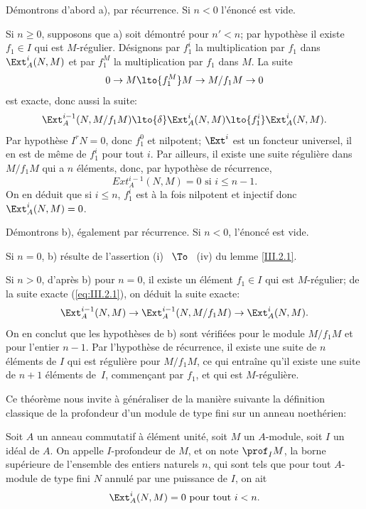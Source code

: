 D\'emontrons d'abord a), par r\'ecurrence. Si $n<0$ l'\'enonc\'e est vide.

Si $n\geq 0$, supposons que a) soit d\'emontr\'e pour $n'<n$; par hypoth\`ese il existe $f_1\in I$ qui est $M$-r\'egulier. D\'esignons par $f_1^i$ la multiplication par $f_1$ dans $\Ext_A^i(N, M)$ et par $f_1^M$ la multiplication par $f_1$ dans $M$. La suite
\begin{equation} \label{eq:III.2.1}
0 \to M \lto{f_1^M} M \to M/f_1M \to 0
\end{equation}
est exacte, donc aussi la suite:
\[
\Ext_A^{i-1} (N, M/f_1M) \lto{\delta}\Ext_A^i (N, M) \lto{f_1^i} \Ext_A^i (N, M).
\]
Par hypoth\`ese $I^rN=0$, donc $f_1^0$ et nilpotent; $\Ext^i$ est un foncteur universel, il en est de m\^eme de $f_1^i$ pour tout $i$. Par ailleurs, il existe une suite r\'eguli\`ere dans $M/f_1 M$ qui a $n$ \'el\'ements, donc, par hypoth\`ese de r\'ecurrence,
\[
Ext_A^{i-1}(N, M)=0 \text{ si } i\leq n-1.
\]
On en d\'eduit que si $i\leq n$, $f_1^i$ est \`a la fois nilpotent et injectif donc $\Ext_A^i(N, M)=0$.

D\'emontrons b), \'egalement par r\'ecurrence. Si $n<0$, l'\'enonc\'e est vide.

Si $n=0$, b) r\'esulte de l'assertion (i) ~$\To$~ (iv) du lemme \ref{III.2.1}.

Si $n>0$, d'apr\`es b) pour $n=0$, il existe un \'el\'ement $f_1\in I$ qui est $M$-r\'egulier; de la suite exacte (\ref{eq:III.2.1}), on d\'eduit la suite exacte:
\begin{equation} \label{eq:III.2.2} \Ext_A^{i-1} (N, M) \to \Ext_A^{i-1} (N, M/f_1M) \to \Ext_A^i (N, M).
\end{equation}
On en conclut que les hypoth\`eses de b) sont v\'erifi\'ees pour le
module $M/f_1M$ et pour l'entier $n-1$. Par l'hypoth\`ese de
r\'ecurrence, il existe une suite de $n$ \'el\'ements de $I$ qui est
r\'eguli\`ere pour $M/f_1M$, ce qui entra\^ine qu'il existe une
suite de $n+1$ \'el\'ements de~$I$, commen\c cant par $f_1$, et qui
est $M$-r\'eguli\`ere.

Ce th\'eor\`eme nous invite \`a g\'en\'eraliser de la mani\`ere suivante la d\'efinition classique de la profondeur d'un module de type fini sur un anneau noeth\'erien:

\begin{definition} \label{III.2.3}
Soit $A$ un anneau commutatif \`a \'el\'ement unit\'e, soit $M$ un $A$-module, soit $I$ un id\'eal de $A$. On appelle $I$-profondeur de $M$, et on note $\prof_I M$, la borne sup\'erieure \ignorespaces de l'ensemble des entiers naturels $n$, qui sont tels que pour tout $A$-module de type fini $N$ annul\'e par une puissance de $I$, on ait
\[
\Ext_A^i(N, M)=0 \text{ pour tout } i< n.
\]
\end{definition}

